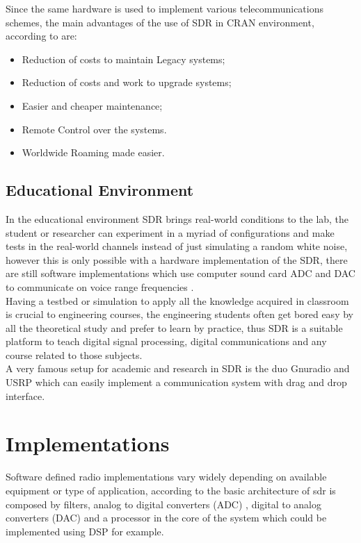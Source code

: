 Since the same hardware is used to implement various telecommunications schemes,
the main advantages of the use of SDR in CRAN environment, according to \cite{dayananda2012} are:

\begin{itemize}
    \item Reduction of costs to maintain Legacy systems;
    \item Reduction of costs and work to upgrade systems;
    \item Easier and cheaper maintenance;
    \item Remote Control over the systems.
    \item Worldwide Roaming made easier.
\end{itemize}


\subsection{Educational Environment}

In the educational environment SDR brings real-world conditions to the lab, the
student or researcher can experiment in a myriad of configurations and make tests
in the real-world channels instead of just simulating a random white noise, however
this is only possible with a hardware implementation of the SDR, there are still
software implementations which use computer sound card ADC and DAC to communicate
on voice range frequencies \cite{ladimer2009}.\\

Having a testbed or simulation to apply all the knowledge acquired in classroom
is crucial to engineering courses, the engineering students often get bored easy
by all the theoretical study and prefer to learn by practice, thus SDR is a
suitable platform to teach digital signal processing, digital communications and
 any course related to those subjects.\\

A very famous setup for academic and research in SDR is the duo Gnuradio \cite{web:gnuradio} and
USRP \cite{web:usrp} which can easily implement a communication system with drag
and drop interface\cite{akbook}.\\


\section{Implementations}

Software defined radio implementations vary widely depending on available equipment
 or type of application, according to \cite{ladimer2009} the basic architecture of sdr is
 composed by filters, analog to digital converters (ADC) , digital to analog
 converters (DAC) and a processor in the core of the system which could be
 implemented using DSP for example.\\

